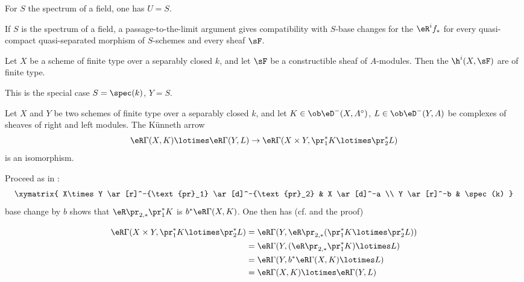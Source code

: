 For $S$ the spectrum of a field, one has $U=S$.

If $S$ is the spectrum of a field, a passage-to-the-limit argument gives
compatibility with $S$-base changes for the $\eR^i f_\ast$ for every
quasi-compact quasi-separated morphism of $S$-schemes and every sheaf $\sF$.






\begin{corollary_}\label{VII:1-10}
Let $X$ be a scheme of finite type over a separably closed $k$, and let
$\sF$ be a constructible sheaf of $A$-modules. Then the $\h^i(X,\sF)$ are of
finite type.
\end{corollary_}

This is the special case $S=\spec(k)$, $Y=S$.

\begin{corollary_}\label{VII:1-11}
Let $X$ and $Y$ be two schemes of finite type over a separably closed $k$,
and let $K\in \ob\eD^-(X,A^\circ)$,
$L\in \ob\eD^-(Y,A)$ be complexes of sheaves of right and left modules. The
K\"unneth arrow
\[
  \eR \Gamma(X,K) \lotimes \eR \Gamma(Y,L) \to \eR\Gamma(X\times Y,\pr_1^\ast K \lotimes \pr_2^\ast L)
\]
is an isomorphism.
\end{corollary_}

Proceed as in \cite[XVII 5.4.3]{sga4}:
\[\xymatrix{
  X\times Y \ar[r]^-{\text{pr}_1} \ar[d]^-{\text{pr}_2}
    & X \ar[d]^-a \\
  Y \ar[r]^-b
    & \spec(k)
}\]
base change by $b$ shows that $\eR\pr_{2,\ast}{} \pr_1^\ast K$ is
$b^\ast \eR\Gamma(X,K)$. One then has (cf.
\cite[XVII 5.2.11]{sga4} and the proof)

\begin{align*}
  \eR\Gamma(X\times Y,\pr_1^\ast K\lotimes \pr_2^\ast L)
    &= \eR\Gamma(Y,\eR \pr_{2,\ast}(\pr_1^\ast K\lotimes \pr_2^\ast L)) \\
    &= \eR\Gamma(Y,(\eR\pr_{2,\ast}\pr_1^\ast K)\lotimes L) \\
    &= \eR\Gamma(Y,b^\ast \eR\Gamma(X,K)\lotimes L) \\
    &= \eR\Gamma(X,K)\lotimes \eR\Gamma(Y,L)
\end{align*}






\subsection{}\label{VII:1-12}

